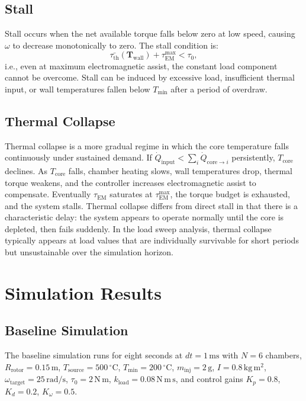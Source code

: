 \documentclass[11pt, a4paper]{article}
\theoremstyle{plain}
\theoremstyle{definition}
\newcommand{\Tcore}{T_{\mathrm{core}}}
\newcommand{\Tsource}{T_{\mathrm{source}}}
\newcommand{\tauEM}{\tau_{\mathrm{EM}}}
\newcommand{\tauth}{\tau_{\mathrm{th}}}
\newcommand{\om}{\omega}
\newcommand{\Nch}{N}
\begin{document}
\subsection{Stall}

Stall occurs when the net available torque falls below zero at low speed, causing $\om$ to decrease monotonically to zero. The stall condition is:
\begin{equation}
  \bar{\tauth}(\mathbf{T}_{\mathrm{wall}}) + \tauEM^{\mathrm{max}} < \tau_0,
\end{equation}
i.e., even at maximum electromagnetic assist, the constant load component cannot be overcome. Stall can be induced by excessive load, insufficient thermal input, or wall temperatures fallen below $T_{\mathrm{min}}$ after a period of overdraw.

\subsection{Thermal Collapse}

Thermal collapse is a more gradual regime in which the core temperature falls continuously under sustained demand. If $\dot{Q}_{\mathrm{input}} < \sum_i \dot{Q}_{\mathrm{core}\to i}$ persistently, $\Tcore$ declines. As $\Tcore$ falls, chamber heating slows, wall temperatures drop, thermal torque weakens, and the controller increases electromagnetic assist to compensate. Eventually $\tauEM$ saturates at $\tauEM^{\mathrm{max}}$, the torque budget is exhausted, and the system stalls. Thermal collapse differs from direct stall in that there is a characteristic delay: the system appears to operate normally until the core is depleted, then fails suddenly. In the load sweep analysis, thermal collapse typically appears at load values that are individually survivable for short periods but unsustainable over the simulation horizon.

\section{Simulation Results}
\label{sec:results}

\subsection{Baseline Simulation}

The baseline simulation runs for eight seconds at $dt = 1\,\mathrm{ms}$ with $\Nch = 6$ chambers, $R_{\mathrm{rotor}} = 0.15\,\mathrm{m}$, $\Tsource = 500\,{}^\circ\mathrm{C}$, $T_{\mathrm{min}} = 200\,{}^\circ\mathrm{C}$, $m_{\mathrm{inj}} = 2\,\mathrm{g}$, $I = 0.8\,\mathrm{kg\,m^2}$, $\om_{\mathrm{target}} = 25\,\mathrm{rad/s}$, $\tau_0 = 2\,\mathrm{N\,m}$, $k_{\mathrm{load}} = 0.08\,\mathrm{N\,m\,s}$, and control gains $K_p = 0.8$, $K_d = 0.2$, $K_\om = 0.5$.
\end{document}
